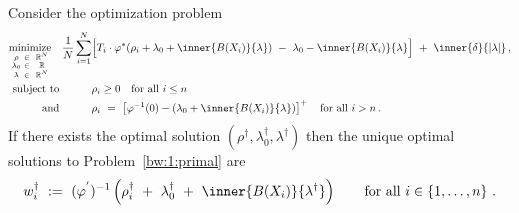 \begin{ftheorem}
  \label{dual_solution_th}
  Consider the optimization problem
\begin{align}
  \label{dual}
  \begin{split}
  \underset
  {\begin{smallmatrix}
      \rho&\in&&\R^N 
      \\
      \lambda_0 & \in&&\R
      \\
      \lambda&\in&&\R^{N}
  \end{smallmatrix}}
  {
    \mathrm{minimize}
  }
  \quad
  \frac{1}{N}
\sum_{i=1} 
  ^N
  &
  \Big[
  T_i
  \cdot
  \varphi^*
  \!
  \left( 
    \rho_i
    +
\lambda_0
+
\inner
{B(X_i)}
{
\lambda
}
  \right)
  \ 
  -
  \ 
\lambda_0
-
\inner
{B(X_i)}
{
\lambda
}
\Big]
  \ 
+
\ 
\inner
{\delta}
{
  |\lambda|
}
  \,,
  \\
  \mathrm{subject}\ \mathrm{to}
  \quad
  \qquad
  &
  \rho_i \ge 0 
  \quad 
  \mathrm{for}\ \mathrm{all}\ i\le n
  \qquad 
  \\
  \mathrm{and}
  \quad
  \qquad
  &
  \rho_i
  \ 
  =
  \ 
  \left[ 
  \varphi^{-1}
  (0)
  -
  \left( 
  \lambda_0 + \inner{B(X_i)}{\lambda}
  \right)
  \right]^+
  \quad 
  \mathrm{for}\ \mathrm{all}\ i>n
  \,.
\end{split}
\end{align}
If there exists the optimal solution 
$
(\rho^\dagger,\lambda_0^\dagger,\lambda^\dagger)
$
then the unique optimal solutions to Problem~\ref{bw:1:primal} are 
\begin{gather*}
  w^\dagger_i
  \ 
  :=
  \ 
  (
  \varphi^{'}
  )^{-1}
  \left(
    \rho^\dagger_i
  \ 
    +
  \ 
\lambda_0^\dagger
  \ 
+
  \ 
\inner
{B(X_i)}
{
\lambda^{\dagger}
}
  \right)
  \qquad
  \text{for all}\ 
  i\in
  \left\{ 1,\ldots,n \right\}
  \,.
\end{gather*}
\end{ftheorem}

